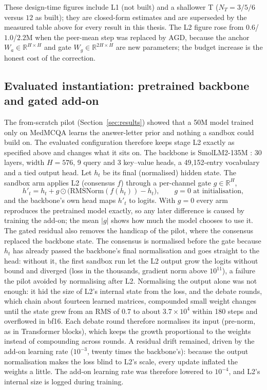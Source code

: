 \documentclass[11pt,a4paper]{article}
\theoremstyle{plain}
\theoremstyle{definition}
\theoremstyle{remark}
\begin{document}
\noindent
These design-time figures include L1 (not built) and a shallower T
($N_T{=}3/5/6$ versus $12$ as built); they are closed-form estimates and are
superseded by the measured table above for every result in this thesis.
The L2 figure rose from $0.6$/$1.0$/$2.2$M when the peer-mean step was
replaced by AGD, because the anchor $W_a \in \mathbb{R}^{H \times H}$ and gate
$W_g \in \mathbb{R}^{2H \times H}$ are new parameters; the budget increase is
the honest cost of the correction.

\subsection{Evaluated instantiation: pretrained backbone and gated add-on}
\label{sec:v2}

\noindent
The from-scratch pilot (Section~\ref{sec:results}) showed that a 50M model
trained only on MedMCQA learns the answer-letter prior and nothing a sandbox
could build on. The evaluated configuration therefore keeps stage L2 exactly as
specified above and changes what it sits on. The backbone is SmolLM2-135M
\cite{allal2025smollm2}: 30 layers, width $H=576$, 9 query and 3 key--value
heads, a 49{,}152-entry vocabulary and a tied output head. Let $h_t$ be its
final (normalised) hidden state. The sandbox arm applies L2 (consensus
$f$) through a per-channel gate $g\in\mathbb{R}^{H}$,
\begin{equation}
  h'_t = h_t + g \odot \bigl(\mathrm{RMSNorm}(f(h_t)) - h_t\bigr),\qquad g = 0 \text{ at initialisation},
  \label{eq:gated-addon}
\end{equation}
and the backbone's own head maps $h'_t$ to logits. With $g=0$ every arm
reproduces the pretrained model exactly, so any later difference is caused by
training the add-on; the mean $|g|$ shows how much the model chooses to use it.
The gated residual also removes the handicap of the pilot, where the consensus
replaced the backbone state. The consensus is normalised before the gate
because $h_t$ has already passed the backbone's final normalisation and goes
straight to the head: without it, the first sandbox run let the L2 output grow
the logits without bound and diverged (loss in the thousands, gradient norm
above $10^{11}$), a failure the pilot avoided by normalising after L2.
Normalising the output alone was not enough: it hid the size of L2's internal
state from the loss, and the debate rounds, which chain about fourteen learned
matrices, compounded small weight changes until the state grew from an RMS of
$0.7$ to about $3.7\times10^{4}$ within 180 steps and overflowed in bf16. Each
debate round therefore normalises its input (pre-norm, as in Transformer
blocks), which keeps the growth proportional to the weights instead of
compounding across rounds. A residual drift remained, driven by the add-on
learning rate ($10^{-3}$, twenty times the backbone's): because the output
normalisation makes the loss blind to L2's scale, every update inflated the
weights a little. The add-on learning rate was therefore lowered to
$10^{-4}$, and L2's internal size is logged during training.
\end{document}
